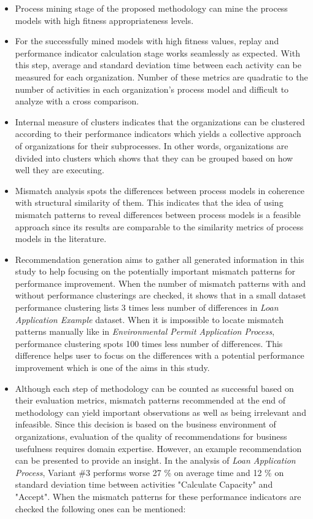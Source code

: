 \begin{itemize}
	\item Process mining stage of the proposed methodology can mine the process models with high fitness appropriateness levels.
	\item For the successfully mined models with high fitness values, replay and performance indicator calculation stage works seamlessly as expected. With this step, average and standard deviation time between each activity can be measured for each organization. Number of these metrics are quadratic to the number of activities in each organization's process model and difficult to analyze with a cross comparison.
	\item Internal measure of clusters indicates that the organizations can be clustered according to their performance indicators which yields a collective approach of organizations for their subprocesses. In other words, organizations are divided into clusters which shows that they can be grouped based on how well they are executing.
	\item Mismatch analysis spots the differences between process models in coherence with structural similarity of them. This indicates that the idea of using mismatch patterns to reveal differences between process models is a feasible approach since its results are comparable to the similarity metrics of process models in the literature.
	\item Recommendation generation aims to gather all generated information in this study to help focusing on the potentially important mismatch patterns for performance improvement. When the number of mismatch patterns with and without performance clusterings are checked, it shows that in a small dataset performance clustering lists 3 times less number of differences in \textit{Loan Application Example} dataset. When it is impossible to locate mismatch patterns manually like in \textit{Environmental Permit Application Process}, performance clustering spots 100 times less number of differences. This difference helps user to focus on the differences with a potential performance improvement which is one of the aims in this study.
	\item Although each step of methodology can be counted as successful based on their evaluation metrics, mismatch patterns recommended at the end of methodology can yield important observations as well as being irrelevant and infeasible. Since this decision is based on the business environment of organizations, evaluation of the quality of recommendations for business usefulness requires domain expertise. However, an example recommendation can be presented to provide an insight. In the analysis of \textit{Loan Application Process}, Variant \#3 performs worse 27 \%  on average time and 12 \% on standard deviation time between activities "Calculate Capacity" and "Accept". When the mismatch patterns for these performance indicators are checked the following ones can be mentioned:

\end{itemize}

